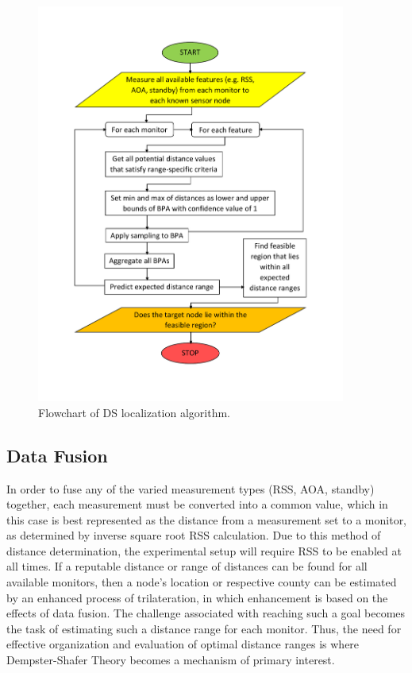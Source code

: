 \documentclass[12pt]{uthesis-v12}  %
\begin{document}
\begin{figure}[!t]
\centering
\includegraphics[width=4in]{flowchart1}
\caption{Flowchart of DS localization algorithm.}
\label{dsalg1}
\end{figure}

\subsection{Data Fusion}

In order to fuse any of the varied measurement types (RSS, AOA, standby) together, each measurement must be converted into a common value, which in this case is best represented as the distance from a measurement set to a monitor, as determined by inverse square root RSS calculation. Due to this method of distance determination, the experimental setup will require RSS to be enabled at all times. If a reputable distance or range of distances can be found for all available monitors, then a node's location or respective county can be estimated by an enhanced process of trilateration, in which enhancement is based on the effects of data fusion. The challenge associated with reaching such a goal becomes the task of estimating such a distance range for each monitor. Thus, the need for effective organization and evaluation of optimal distance ranges is where Dempster-Shafer Theory becomes a mechanism of primary interest.
\end{document}
